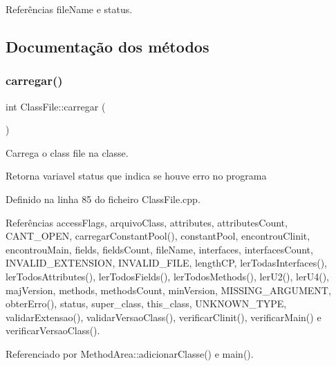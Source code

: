 Referências file\+Name e status.



\subsection{Documentação dos métodos}
\mbox{\label{classClassFile_a619e102ada15202ab84981d43362a3e9}} 
\subsubsection{\texorpdfstring{carregar()}{carregar()}}
{\footnotesize\ttfamily int Class\+File\+::carregar (\begin{DoxyParamCaption}{ }\end{DoxyParamCaption})}



Carrega o class file na classe. 

\begin{DoxyReturn}{Retorna}
variavel status que indica se houve erro no programa 
\end{DoxyReturn}


Definido na linha 85 do ficheiro Class\+File.\+cpp.



Referências access\+Flags, arquivo\+Class, attributes, attributes\+Count, C\+A\+N\+T\+\_\+\+O\+P\+EN, carregar\+Constant\+Pool(), constant\+Pool, encontrou\+Clinit, encontrou\+Main, fields, fields\+Count, file\+Name, interfaces, interfaces\+Count, I\+N\+V\+A\+L\+I\+D\+\_\+\+E\+X\+T\+E\+N\+S\+I\+ON, I\+N\+V\+A\+L\+I\+D\+\_\+\+F\+I\+LE, length\+CP, ler\+Todas\+Interfaces(), ler\+Todos\+Attributes(), ler\+Todos\+Fields(), ler\+Todos\+Methods(), ler\+U2(), ler\+U4(), maj\+Version, methods, methods\+Count, min\+Version, M\+I\+S\+S\+I\+N\+G\+\_\+\+A\+R\+G\+U\+M\+E\+NT, obter\+Erro(), status, super\+\_\+class, this\+\_\+class, U\+N\+K\+N\+O\+W\+N\+\_\+\+T\+Y\+PE, validar\+Extensao(), validar\+Versao\+Class(), verificar\+Clinit(), verificar\+Main() e verificar\+Versao\+Class().



Referenciado por Method\+Area\+::adicionar\+Classe() e main().

